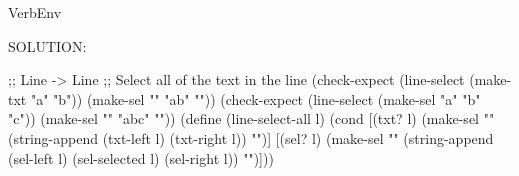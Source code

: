 \documentclass[12pt]{article}
\begin{document}
\begin{SaveVerbatim}{VerbEnv}

SOLUTION:
  
;; Line -> Line
;; Select all of the text in the line
(check-expect (line-select (make-txt "a" "b")) (make-sel "" "ab" ""))
(check-expect (line-select (make-sel "a" "b" "c")) (make-sel "" "abc" ""))
(define (line-select-all l)
  (cond [(txt? l) (make-sel "" (string-append (txt-left l) (txt-right l)) "")]
        [(sel? l)
         (make-sel ""
                   (string-append (sel-left l)
                                  (sel-selected l)
                                  (sel-right l)) "")]))
\end{SaveVerbatim}

\end{document}
